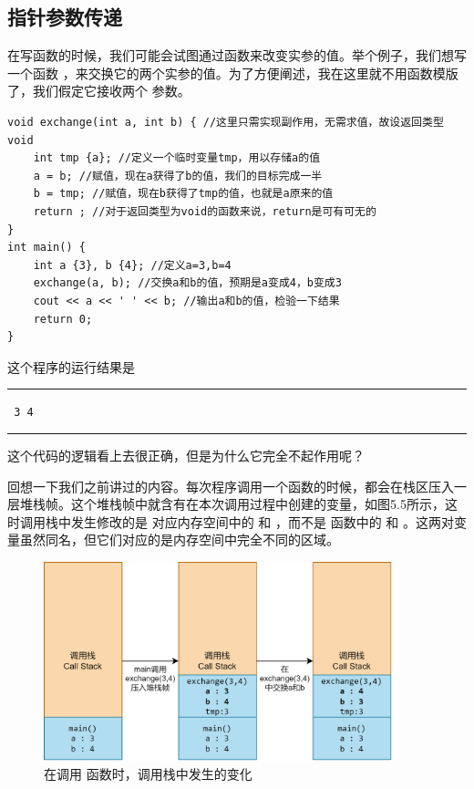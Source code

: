 \subsection*{指针参数传递}
在写函数的时候，我们可能会试图通过函数来改变实参的值。举个例子，我们想写一个函数 \lstinline@exchange@，来交换它的两个实参的值。为了方便阐述，我在这里就不用函数模版了，我们假定它接收两个 \lstinline@int@ 参数。
\begin{lstlisting}
void exchange(int a, int b) { //这里只需实现副作用，无需求值，故设返回类型void
    int tmp {a}; //定义一个临时变量tmp，用以存储a的值
    a = b; //赋值，现在a获得了b的值，我们的目标完成一半
    b = tmp; //赋值，现在b获得了tmp的值，也就是a原来的值
    return ; //对于返回类型为void的函数来说，return是可有可无的
}
int main() {
    int a {3}, b {4}; //定义a=3,b=4
    exchange(a, b); //交换a和b的值，预期是a变成4，b变成3
    cout << a << ' ' << b; //输出a和b的值，检验一下结果
    return 0;
}
\end{lstlisting}
这个程序的运行结果是\\\noindent\rule{\linewidth}{0.2pt}\texttt{
3 4
}\\\noindent\rule{\linewidth}{0.2pt}
这个代码的逻辑看上去很正确，但是为什么它完全不起作用呢？\par
回想一下我们之前讲过的内容。每次程序调用一个函数的时候，都会在栈区压入一层堆栈帧。这个堆栈帧中就含有在本次调用过程中创建的变量，如图5.5所示，这时调用栈中发生修改的是 \lstinline@exchange@ 对应内存空间中的 \lstinline@a@ 和 \lstinline@b@，而不是 \lstinline@main@ 函数中的 \lstinline@a@ 和 \lstinline@b@。这两对变量虽然同名，但它们对应的是内存空间中完全不同的区域。\par
\begin{figure}[htbp]
    \centering
    \includegraphics[width=0.9\textwidth]{../images/generalized_parts/05_parameter_pass_by_value_300.png}
    \caption{在调用 \lstinline@exchange@ 函数时，调用栈中发生的变化}
\end{figure}
